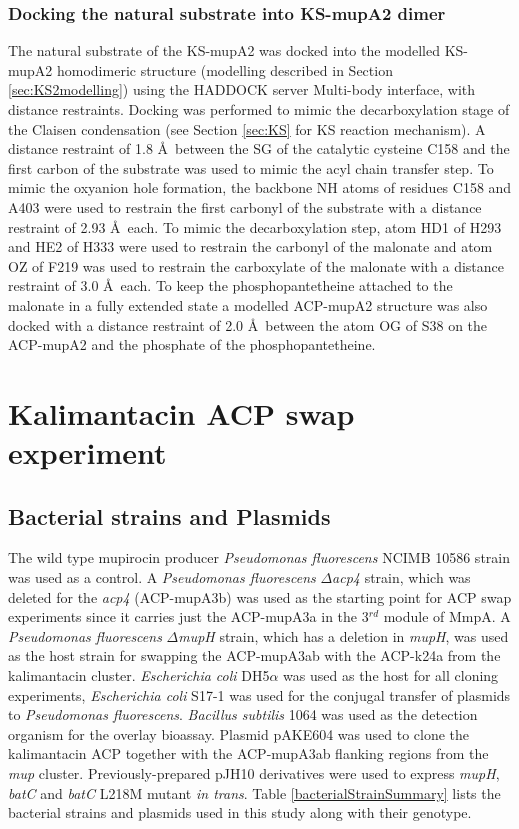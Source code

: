 			\subsubsection{Docking the natural substrate into KS-mupA2 dimer}
			\label{sec:Ks2Docking}
			The natural substrate of the KS-mupA2 was docked into the modelled KS-mupA2 homodimeric structure (modelling described in Section \ref{sec:KS2modelling}) using the HADDOCK server Multi-body interface, with distance restraints. Docking was performed to mimic the decarboxylation stage of the Claisen condensation (see Section \ref{sec:KS} for KS reaction mechanism). A distance restraint of 1.8 \AA \ between the SG of the catalytic cysteine C158 and the first carbon of the substrate was used to mimic the acyl chain transfer step. To mimic the oxyanion hole formation, the backbone NH atoms of residues C158 and A403 were used to restrain the first carbonyl of the substrate with a distance restraint of 2.93 \AA \ each. To  mimic the decarboxylation step, atom HD1 of H293 and HE2 of H333 were used to restrain the carbonyl of the malonate and atom OZ of F219 was used to restrain the carboxylate of the malonate with a distance restraint of 3.0 \AA \ each. To keep the phosphopantetheine attached to the malonate in a fully extended state a modelled ACP-mupA2 structure was also docked with a distance restraint of 2.0 \AA  \ between the atom OG of S38 on the ACP-mupA2 and the phosphate of the phosphopantetheine.
			
	\section{Kalimantacin ACP swap experiment}
	\label{sec:kalacpswap}
	
		\subsection{Bacterial strains and Plasmids}
		\label{sec:bactstrains}
		The wild type mupirocin producer \textit{Pseudomonas fluorescens} NCIMB 10586 strain was used as a control. A \textit{Pseudomonas fluorescens} $ \Delta $\textit{acp4} strain, which was deleted for the \textit{acp4} (ACP-mupA3b) was used as the starting point for ACP swap experiments since it carries just the ACP-mupA3a in the 3$ ^{rd} $ module of MmpA.  A  \textit{Pseudomonas fluorescens} $ \Delta $\textit{mupH} strain, which has a deletion in \textit{mupH}, was used as the  host strain for swapping the ACP-mupA3ab with the ACP-k24a from the kalimantacin cluster. \textit{Escherichia coli} DH5$ \alpha $ was used as the host for all cloning experiments, \textit{Escherichia coli} S17-1 was used for the conjugal transfer of plasmids to \textit{Pseudomonas fluorescens}. \textit{Bacillus subtilis} 1064 was used as the detection organism for the overlay bioassay. Plasmid pAKE604 was used to clone the kalimantacin ACP together with the ACP-mupA3ab flanking regions from the \textit{mup} cluster. Previously-prepared pJH10 derivatives were used to express \textit{mupH}, \textit{batC} and \textit{batC} L218M mutant \textit{in trans}. Table \ref{bacterialStrainSummary} lists the bacterial strains and plasmids used in this study along with their genotype.
		
